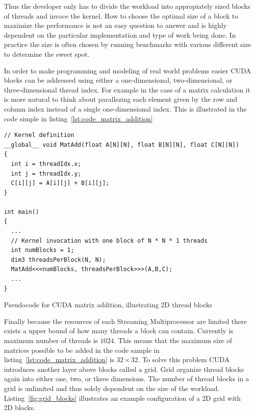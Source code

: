 \documentclass[a4paper,11pt]{kth-mag}
\begin{document}
Thus the developer only has to divide the workload into appropiately sized blocks of threads and invoce the kernel. How to choose the optimal size of a block to maximize the performance is not an easy question to answer and is highly dependent on the particular implementation and type of work being done. In practice the size is often chosen by running benchmarks with various different size to determine the sweet spot.

In order to make programming and modeling of real world problems easier CUDA blocks can be addressed using either a one-dimensional, two-dimensional, or three-dimensional thread index. For example in the case of a matrix calculation it is more natural to think about parallezing each element given by the row and column index instead of a single one-dimensional index. This is illustrated in the code simple in listing~\ref{lst:code_matrix_addition}

\begin{listing}
  \centering
  \begin{verbatim}
// Kernel definition
__global__ void MatAdd(float A[N][N], float B[N][N], float C[N][N])
{
  int i = threadIdx.x;
  int j = threadIdx.y;
  C[i][j] = A[i][j] + B[i][j];
}

int main()
{
  ...
  // Kernel invocation with one block of N * N * 1 threads
  int numBlocks = 1;
  dim3 threadsPerBlock(N, N);
  MatAdd<<<numBlocks, threadsPerBlock>>>(A,B,C);
  ...
}
  \end{verbatim}
  \caption{Pseudocode for CUDA matrix addition, illustrating 2D thread blocks}
  \label{lst:code_matrix_addition}
\end{listing}

Finally because the resources of each Streaming Multiprocessor are limited there exists a upper bound of how many threads a block can contain. Currently is maximum number of threads is $1024$. This means that the maximum size of matrices possible to be added in the code sample in listing~\ref{lst:code_matrix_addition} is $32\times32$. To solve this problem CUDA introduces another layer above blocks called a grid. Grid organize thread blocks again into either one, two, or three dimensions. The number of thread blocks in a grid is unlimited and thus solely dependent on the size of the workload. Listing~\ref{fig:grid_blocks} illustrates an example configuration of a 2D grid with 2D blocks.
\end{document}
